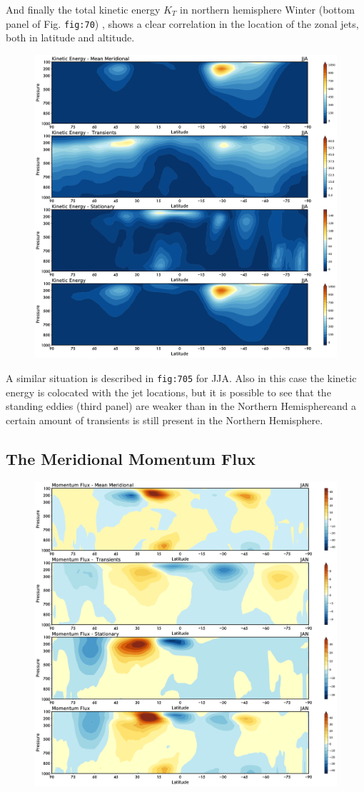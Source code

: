 And finally the total kinetic energy \(K_T\) in northern hemisphere
Winter (bottom panel of Fig. \texttt{fig:70}) , shows a clear
correlation in the location of the zonal jets, both in latitude and
altitude.

\begin{figure}
	\centering
	\includegraphics[width = .7 \textwidth]{figs/GD/JJAKEFlux.png}
	\caption{}\label{}
\end{figure}

A similar situation is described in \texttt{fig:705} for JJA. Also in
this case the kinetic energy is colocated with the jet locations, but it
is possible to see that the standing eddies (third panel) are weaker
than in the Northern Hemisphereand a certain amount of transients is
still present in the Northern Hemisphere.

\subsection{The Meridional Momentum
	Flux}\label{the-meridional-momentum-flux}

\begin{figure}
	\centering
	\includegraphics[width = .7 \textwidth]{figs/GD/JANUVFlux.png}
	\caption{}\label{}
\end{figure}

